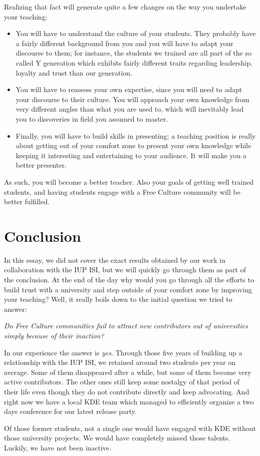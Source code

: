 Realizing that fact will generate quite a few changes on the way you undertake
your teaching:
\begin{itemize}
  \item You will have to understand the culture of your students. They probably
have a fairly different background from you and you will have to adapt your
discourse to them; for instance, the students we trained are all part of the so
called Y generation which exhibits fairly different traits regarding leadership,
loyalty and trust than our generation.
  \item You will have to reassess your own expertise, since you will need to
adapt your discourse to their culture. You will approach your own knowledge from
very different angles than what you are used to, which will inevitably lead you
to discoveries in field you assumed to master.
  \item Finally, you will have to build skills in presenting; a teaching
position is really about getting out of your comfort zone to present your own
knowledge while keeping it interesting and entertaining to your audience. It
will make you a better presenter.
\end{itemize}

As such, you will become a better teacher. Also your goals of getting well
trained students, and having students engage with a Free Culture community will
be better fulfilled.

\section*{Conclusion}
In this essay, we did not cover the exact results obtained by our work in
collaboration with the IUP ISI, but we will quickly go through them as part of
the conclusion. At the end of the day why would you go through all the efforts
to build trust with a university and step outside of your comfort zone by
improving your teaching? Well, it really boils down to the initial question we
tried to answer:

\emph{Do Free Culture communities fail to attract new contributors out of
universities simply because of their inaction?}

In our experience the answer is \emph{yes}. Through those five years of building
up a relationship with the IUP ISI, we retained around two students per year on
average. Some of them disappeared after a while, but some of them become very
active contributors. The other ones still keep some nostalgy of that period of
their life even though they do not contribute directly and keep advocating. And
right now we have a local KDE team which managed to efficiently organize a two
days conference for our latest release party.

Of those former students, not a single one would have engaged with KDE without
those university projects. We would have completely missed those talents.
Luckily, we have not been inactive.
